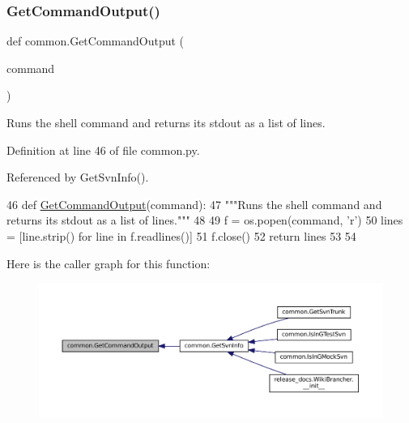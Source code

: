 \subsubsection{\texorpdfstring{Get\+Command\+Output()}{GetCommandOutput()}}
{\footnotesize\ttfamily def common.\+Get\+Command\+Output (\begin{DoxyParamCaption}\item[{}]{command }\end{DoxyParamCaption})}

\begin{DoxyVerb}Runs the shell command and returns its stdout as a list of lines.\end{DoxyVerb}
 

Definition at line 46 of file common.\+py.



Referenced by Get\+Svn\+Info().


\begin{DoxyCode}
46 \textcolor{keyword}{def }\hyperlink{namespacecommon_ac1337758ae23f6a91b44de07408791da}{GetCommandOutput}(command):
47   \textcolor{stringliteral}{"""Runs the shell command and returns its stdout as a list of lines."""}
48 
49   f = os.popen(command, \textcolor{stringliteral}{'r')}
50 \textcolor{stringliteral}{  lines = [line.strip() }\textcolor{keywordflow}{for} line \textcolor{keywordflow}{in} f.readlines()]
51   f.close()
52   \textcolor{keywordflow}{return} lines
53 
54 
\end{DoxyCode}
Here is the caller graph for this function\+:
\nopagebreak
\begin{figure}[H]
\begin{center}
\leavevmode
\includegraphics[width=350pt]{namespacecommon_ac1337758ae23f6a91b44de07408791da_icgraph}
\end{center}
\end{figure}
\mbox{\label{namespacecommon_a312d07161b76d965fee6a61e464e283f}} 
